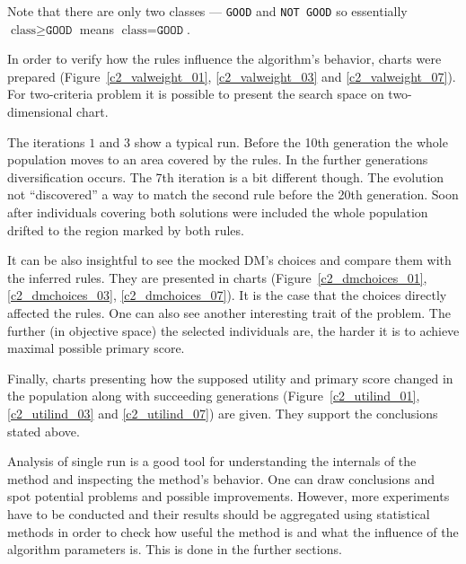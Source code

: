 Note that there are only two classes --- \texttt{GOOD} and \texttt{NOT GOOD}
so essentially $\text{class} \ge \texttt{GOOD}$ means $\text{class} =
\texttt{GOOD}$.

In order to verify how the rules influence the algorithm's behavior, charts
were prepared (Figure~\ref{c2_valweight_01}, \ref{c2_valweight_03} and
\ref{c2_valweight_07}). For two-criteria problem it is possible to present the
search space on two-dimensional chart.

The iterations $1$ and $3$ show a typical run. Before the 10th generation the
whole population moves to an area covered by the rules. In the further
generations diversification occurs. The 7th iteration is a bit different
though. The evolution not ``discovered'' a way to match the second rule before
the 20th generation. Soon after individuals covering both solutions were
included the whole population drifted to the region marked by both rules.

It can be also insightful to see the mocked DM's choices and compare them with
the inferred rules. They are presented in charts (Figure~\ref{c2_dmchoices_01},
\ref{c2_dmchoices_03}, \ref{c2_dmchoices_07}). It is the case that the choices
directly affected the rules. One can also see another interesting trait of the
problem. The further (in objective space) the selected individuals are, the
harder it is to achieve maximal possible primary score.

Finally, charts presenting how the supposed utility and primary score changed
in the population along with succeeding generations (Figure~\ref{c2_utilind_01},
\ref{c2_utilind_03} and \ref{c2_utilind_07}) are given. They support the
conclusions stated above.

Analysis of single run is a good tool for understanding the internals of the
method and inspecting the method's behavior. One can draw conclusions and spot
potential problems and possible improvements. However, more experiments have to
be conducted and their results should be aggregated using statistical methods
in order to check how useful the method is and what the influence of the
algorithm parameters is. This is done in the further sections.

